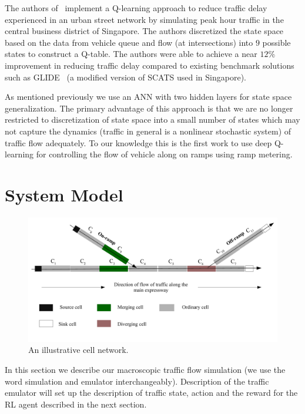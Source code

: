 \documentclass{sig-alternate-05-2015}
\begin{document}
The authors of~\cite{balaji2010urban} implement a Q-learning approach to reduce traffic delay experienced in an urban street network by simulating peak hour traffic in the central business district of Singapore. The authors discretized the state space based on the data from vehicle queue and flow (at intersections) into $9$ possible states to construct a Q-table. The authors were able to achieve a near $12\%$ improvement in reducing traffic delay compared to existing benchmark solutions such as GLIDE~\cite{keong1993glide} (a modified version of SCATS used in Singapore).

As mentioned previously we use an ANN with two hidden layers for state space generalization. The primary advantage of this approach is that we are no longer restricted to discretization of state space into a small number of states which may not capture the dynamics (traffic in general is a nonlinear stochastic system) of traffic flow adequately. To our knowledge this is the first work to use deep Q-learning for controlling the flow of vehicle along on ramps using ramp metering.


     
 \section{System Model}
\label{sec:traffic-sim}

\begin{figure}[!htbp]
    \centering
    \includegraphics[scale=0.5]{images/cellNetwork.pdf}

    \caption{An illustrative cell network.}
    \label{fig:cell-network}
\end{figure}

In this section we describe our macroscopic traffic flow simulation (we use the word simulation and emulator interchangeably). Description of the traffic emulator will set up the description of traffic state, action and the reward for the RL agent described in the next section.
\end{document}
